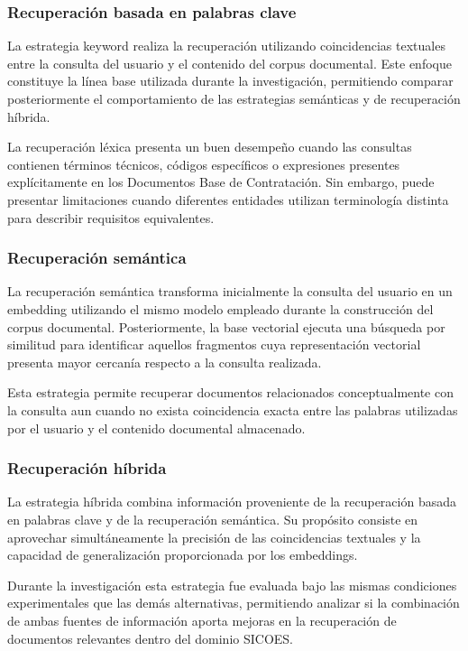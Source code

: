 \subsubsection{Recuperación basada en palabras clave}

La estrategia keyword realiza la recuperación utilizando coincidencias textuales entre la consulta del usuario y el contenido del corpus documental. Este enfoque constituye la línea base utilizada durante la investigación, permitiendo comparar posteriormente el comportamiento de las estrategias semánticas y de recuperación híbrida.

La recuperación léxica presenta un buen desempeño cuando las consultas contienen términos técnicos, códigos específicos o expresiones presentes explícitamente en los Documentos Base de Contratación. Sin embargo, puede presentar limitaciones cuando diferentes entidades utilizan terminología distinta para describir requisitos equivalentes.

\subsubsection{Recuperación semántica}

La recuperación semántica transforma inicialmente la consulta del usuario en un embedding utilizando el mismo modelo empleado durante la construcción del corpus documental. Posteriormente, la base vectorial ejecuta una búsqueda por similitud para identificar aquellos fragmentos cuya representación vectorial presenta mayor cercanía respecto a la consulta realizada.

Esta estrategia permite recuperar documentos relacionados conceptualmente con la consulta aun cuando no exista coincidencia exacta entre las palabras utilizadas por el usuario y el contenido documental almacenado.


\subsubsection{Recuperación híbrida}

La estrategia híbrida combina información proveniente de la recuperación basada en palabras clave y de la recuperación semántica. Su propósito consiste en aprovechar simultáneamente la precisión de las coincidencias textuales y la capacidad de generalización proporcionada por los embeddings.

Durante la investigación esta estrategia fue evaluada bajo las mismas condiciones experimentales que las demás alternativas, permitiendo analizar si la combinación de ambas fuentes de información aporta mejoras en la recuperación de documentos relevantes dentro del dominio SICOES.

